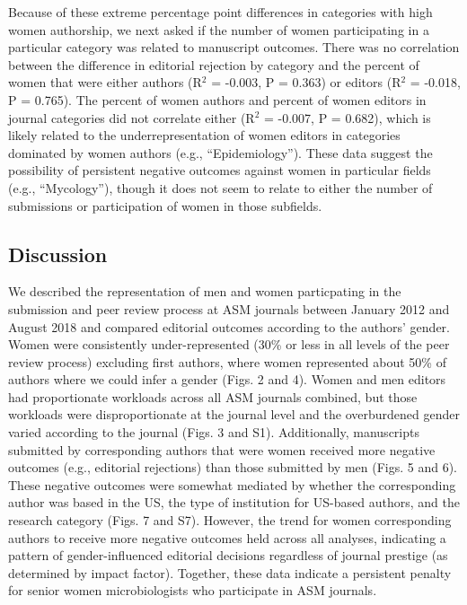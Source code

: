\documentclass[11pt,]{article}
\begin{document}
Because of these extreme percentage point differences in categories with
high women authorship, we next asked if the number of women
participating in a particular category was related to manuscript
outcomes. There was no correlation between the difference in editorial
rejection by category and the percent of women that were either authors
(R\({^2}\) = -0.003, P = 0.363) or editors (R\({^2}\) = -0.018, P =
0.765). The percent of women authors and percent of women editors in
journal categories did not correlate either (R\({^2}\) = -0.007, P =
0.682), which is likely related to the underrepresentation of women
editors in categories dominated by women authors (e.g.,
``Epidemiology''). These data suggest the possibility of persistent
negative outcomes against women in particular fields (e.g.,
``Mycology''), though it does not seem to relate to either the number of
submissions or participation of women in those subfields.

\subsection{Discussion}\label{discussion}

We described the representation of men and women particpating in the
submission and peer review process at ASM journals between January 2012
and August 2018 and compared editorial outcomes according to the
authors' gender. Women were consistently under-represented (30\% or less
in all levels of the peer review process) excluding first authors, where
women represented about 50\% of authors where we could infer a gender
(Figs. 2 and 4). Women and men editors had proportionate workloads
across all ASM journals combined, but those workloads were
disproportionate at the journal level and the overburdened gender varied
according to the journal (Figs. 3 and S1). Additionally, manuscripts
submitted by corresponding authors that were women received more
negative outcomes (e.g., editorial rejections) than those submitted by
men (Figs. 5 and 6). These negative outcomes were somewhat mediated by
whether the corresponding author was based in the US, the type of
institution for US-based authors, and the research category (Figs. 7 and
S7). However, the trend for women corresponding authors to receive more
negative outcomes held across all analyses, indicating a pattern of
gender-influenced editorial decisions regardless of journal prestige (as
determined by impact factor). Together, these data indicate a persistent
penalty for senior women microbiologists who participate in ASM
journals.
\end{document}

